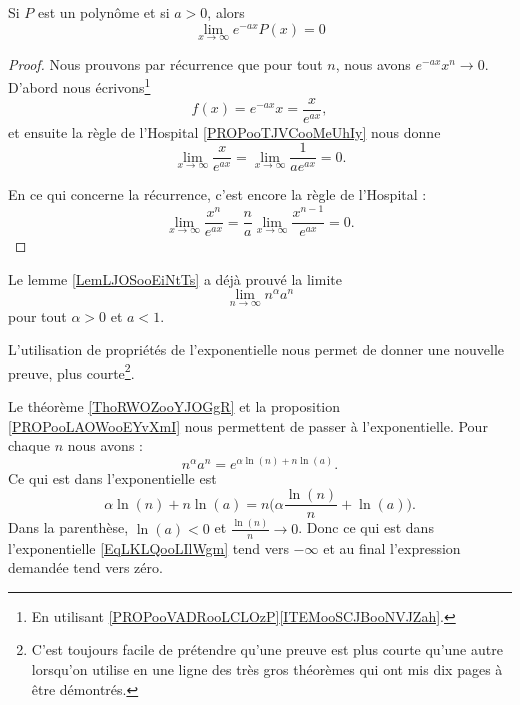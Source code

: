 \begin{lemma}       \label{LEMooNYFVooXjFShk}
	Si \( P\) est un polynôme et si \( a>0\), alors
	\begin{equation}
		\lim_{x\to \infty}  e^{-ax}P(x)=0
	\end{equation}
\end{lemma}

\begin{proof}
	Nous prouvons par récurrence que pour tout \( n\), nous avons \(  e^{-ax}x^n\to 0\). D'abord nous écrivons\footnote{En utilisant \ref{PROPooVADRooLCLOzP}\ref{ITEMooSCJBooNVJZah}.}
	\begin{equation}
		f(x)= e^{-ax}x=\frac{ x }{  e^{ax} },
	\end{equation}
	et ensuite la règle de l'Hospital \ref{PROPooTJVCooMeUhIy} nous donne
	\begin{equation}
		\lim_{x\to \infty} \frac{ x }{  e^{ax} }=\lim_{x\to \infty} \frac{1}{ a e^{ax} }=0.
	\end{equation}

	En ce qui concerne la récurrence, c'est encore la règle de l'Hospital :
	\begin{equation}
		\lim_{x\to \infty} \frac{ x^n }{  e^{ax} }=\frac{ n }{ a }\lim_{x\to \infty} \frac{ x^{n-1} }{  e^{ax} }=0.
	\end{equation}
\end{proof}

\begin{example}     \label{EXooQNCJooFpnvnf}
	Le lemme \ref{LemLJOSooEiNtTs} a déjà prouvé la limite
	\begin{equation}
		\lim_{n\to \infty} n^{\alpha}a^n
	\end{equation}
	pour tout \( \alpha>0\) et \( a<1\).

	L'utilisation de propriétés de l'exponentielle nous permet de donner une nouvelle preuve, plus courte\footnote{C'est toujours facile de prétendre qu'une preuve est plus courte qu'une autre lorsqu'on utilise en une ligne des très gros théorèmes qui ont mis dix pages à être démontrés.}.

	Le théorème \ref{ThoRWOZooYJOGgR} et la proposition \ref{PROPooLAOWooEYvXmI} nous permettent de passer à l'exponentielle. Pour chaque \( n\) nous avons :
	\begin{equation}        \label{EqLKLQooLIlWgm}
		n^{\alpha}a^n= e^{\alpha\ln(n)+n\ln(a)}.
	\end{equation}
	Ce qui est dans l'exponentielle est
	\begin{equation}
		\alpha\ln(n)+n\ln(a)=n\big(\alpha \frac{ \ln(n) }{ n }+\ln(a) \big).
	\end{equation}
	Dans la parenthèse, \( \ln(a)<0\) et \( \frac{ \ln(n) }{ n }\to 0\). Donc ce qui est dans l'exponentielle \eqref{EqLKLQooLIlWgm} tend vers \( -\infty\) et au final l'expression demandée tend vers zéro.
\end{example}

